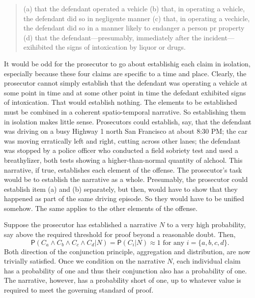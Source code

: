 \documentclass[
  10pt,
  dvipsnames,enabledeprecatedfontcommands]{scrartcl}
\newcommand{\pr}[1]{\mathsf{P}(#1)}
\begin{document}
\begin{quote}
(a) that the defendant operated a vehicle
(b) that, in operating a vehicle, the defendant did so in  negligente manner
(c) that, in operating a vechicle, the defendant did so in a manner likely to endanger a person pr property
(d) that the defendant---presumably, immediately after the incident--- exihibited the signs of intoxication by liquor or drugs.
\end{quote}

\noindent It would be odd for the prosecutor to go about establishig
each claim in isolation, especially because these four claims are
specific to a time and place. Clearly, the prosecutor cannot simply
establish that the defendant was operating a vehicle at some point in
time and at some other point in time the defedant exhibited signs of
intoxication. That would establish nothing. The elements to be
established must be combined in a coherent spatio-temporal narrative. So
establishing them in isolation makes little sense. Prosecutors could
establish, say, that the defendant was driving on a busy Highway 1 north
San Francisco at about 8:30 PM; the car was moving erratically left and
right, cutting across other lanes; the defendant was stopped by a police
officer who conducted a field sobriety test and used a breathylizer,
both tests showing a higher-than-normal quantity of alchool. This
narrative, if true, establishes each element of the offense. The
prosecutor's task would be to establish the narrative as a whole.
Presumably, the prosecutor could establish item (a) and (b) separately,
but then, would have to show that they happened as part of the same
driving episode. So they would have to be unified somehow. The same
applies to the other elements of the offense.

Suppose the prosecutor has established a narrative \(N\) to a very high
probability, say above the required threshold for proof beyond a
reasonable doubt. Then,
\[\text{ $\pr{C_a\wedge C_b \wedge C_c\wedge C_d \vert N}=\pr{C_i \vert N}\approx 1$ for any $i=\{a, b, c, d\}$}.\]
\noindent Both direction of the conjunction principle, aggregation and
distribution, are now trivially satisfied. Once we condition on the
narrative \(N\), each individual claim has a probability of one and thus
their conjunction also has a probability of one. The narrative, however,
has a probability short of one, up to whatever value is required to meet
the governing standard of proof.
\end{document}
